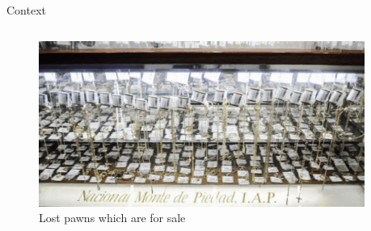 \documentclass[8pt]{beamer}
\begin{document}
\begin{frame}{Context}
\begin{columns}
\begin{column}{.45\textwidth}
\begin{figure}[H]
\begin{center}
    \end{center}
    \end{figure}
\begin{figure}[H]
    \begin{center}
    \caption{Lost pawns which are for sale}
        \includegraphics[width=0.95\textwidth]{Figuras/empenio3_.png}
    \end{center}
    \end{figure}    
    \end{column}    
    \end{columns}
\end{frame}
\end{document}
